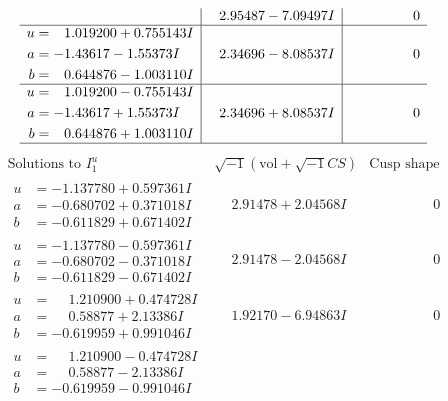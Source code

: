 \documentclass[1p]{elsarticle_modified}
\theoremstyle{definition}
\newcommand{\I}{\sqrt{-1}}
\begin{document}
$$\begin{array}{c|c|c}
 & \phantom{-}2.95487 - 7.09497 I & \phantom{-0.000000 } 0 \\ \hline\begin{aligned}
u &= \phantom{-}1.019200 + 0.755143 I \\
a &= -1.43617 - 1.55373 I \\
b &= \phantom{-}0.644876 - 1.003110 I\end{aligned}
 & \phantom{-}2.34696 - 8.08537 I & \phantom{-0.000000 } 0 \\ \hline\begin{aligned}
u &= \phantom{-}1.019200 - 0.755143 I \\
a &= -1.43617 + 1.55373 I \\
b &= \phantom{-}0.644876 + 1.003110 I\end{aligned}
 & \phantom{-}2.34696 + 8.08537 I & \phantom{-0.000000 } 0\\
 \hline 
 \end{array}$$\newpage$$\begin{array}{c|c|c}  
\text{Solutions to }I^u_{1}& \I (\text{vol} + \sqrt{-1}CS) & \text{Cusp shape}\\
 \hline 
\begin{aligned}
u &= -1.137780 + 0.597361 I \\
a &= -0.680702 + 0.371018 I \\
b &= -0.611829 + 0.671402 I\end{aligned}
 & \phantom{-}2.91478 + 2.04568 I & \phantom{-0.000000 } 0 \\ \hline\begin{aligned}
u &= -1.137780 - 0.597361 I \\
a &= -0.680702 - 0.371018 I \\
b &= -0.611829 - 0.671402 I\end{aligned}
 & \phantom{-}2.91478 - 2.04568 I & \phantom{-0.000000 } 0 \\ \hline\begin{aligned}
u &= \phantom{-}1.210900 + 0.474728 I \\
a &= \phantom{-}0.58877 + 2.13386 I \\
b &= -0.619959 + 0.991046 I\end{aligned}
 & \phantom{-}1.92170 - 6.94863 I & \phantom{-0.000000 } 0 \\ \hline\begin{aligned}
u &= \phantom{-}1.210900 - 0.474728 I \\
a &= \phantom{-}0.58877 - 2.13386 I \\
b &= -0.619959 - 0.991046 I\end{aligned}

\end{array}$$
\end{document}
